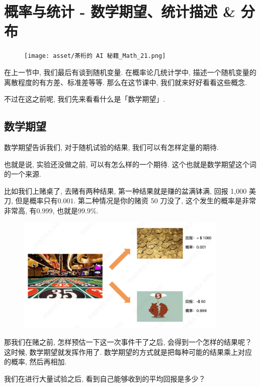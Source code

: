 \chapter{概率与统计 - 数学期望、统计描述 \& 分布}

\begin{figure}[ht]
  \centering
  \texttt{[image: asset/茶桁的 AI 秘籍\_Math\_21.png]}
\end{figure}
\newpage


在上一节中, 我们最后有谈到随机变量. 在概率论几统计学中, 描述一个随机变量的离散程度的有方差、标准差等等. 那么在这节课中, 我们就来好好看看这些概念. 

不过在这之前呢, 我们先来看看什么是「数学期望」. 

\section{数学期望}

数学期望告诉我们, 对于随机试验的结果, 我们可以有怎样定量的期待. 

也就是说, 实验还没做之前, 可以有怎么样的一个期待. 这个也就是数学期望这个词的一个来源. 

比如我们上赌桌了, 去赌有两种结果, 第一种结果就是赚的盆满钵满, 回报 1,000 美刀, 但是概率只有$0.001$. 第二种情况是你的赌资 50 刀没了, 这个发生的概率是非常非常高, 有$0.999$, 也就是$99.9\%$. 

\begin{figure}[ht]
  \centering
  \includegraphics[width=0.9\textwidth]{asset/20230826212939.png}
  \caption{}
  \label{fig:img22_1}
\end{figure}

那我们在赌之前, 怎样预估一下这一次事件干了之后, 会得到一个怎样的结果呢？这时候, 数学期望就发挥作用了. 数学期望的方式就是把每种可能的结果乘上对应的概率, 然后再相加. 

我们在进行大量试验之后, 看到自己能够收到的平均回报是多少？

